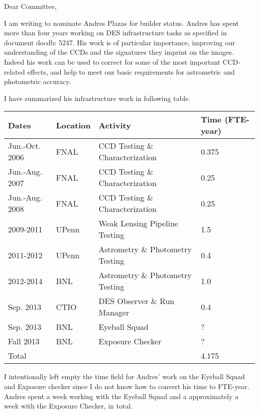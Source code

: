 \documentclass[12pt]{letter}
\begin{document}
\begin{letter}{}

\opening{Dear Committee,}

I am writing to nominate Andres Plazas for builder status.  Andres has spent
more than four years working on DES infrastructure tasks as specified in document
docdb: 5247. His work is of particular importance, improving our understanding
of the CCDs and the signatures they imprint on the images.  Indeed his work
can be used to correct for some of the most important CCD-related effects,
and help to meet our basic requirements for astrometric and photometric accuracy.

I have summarized his infrastructure work in following table.

\begin{tabular}{|l|l|l|l|}
    \hline
    Dates              & Location & Activity                         & Time (FTE-year) \\ \hline \hline
    Jun.-Oct. 2006     & FNAL     & CCD Testing \& Characterization  & 0.375 \\
    Jun.-Aug. 2007     & FNAL     & CCD Testing \& Characterization  & 0.25  \\
    Jun.-Aug. 2008     & FNAL     & CCD Testing \& Characterization  & 0.25  \\
    \hline
    2009-2011          & UPenn    & Weak Lensing Pipeline Testing    & 1.5 \\
    \hline
    2011-2012          & UPenn    & Astrometry \& Photometry Testing & 0.4 \\
    2012-2014          & BNL      & Astrometry \& Photometry Testing & 1.0 \\
    \hline
    Sep. 2013          & CTIO     & DES Observer \& Run Manager      & 0.4 \\
    \hline 
    Sep. 2013          & BNL      & Eyeball Squad                    & ? \\
    \hline 
    Fall 2013          & BNL      & Exposure Checker                 & ? \\
    \hline
    \hline
    Total              &          &                                  & 4.175 \\
    \hline
\end{tabular}

I intentionally left empty the time field for Andres' work on the Eyeball Squad
and Exposure checker since I do not know how to convert his time to FTE-year.
Andres spent a week working with the Eyeball Squad and a approximately a week
with the Exposure Checker, in total.


\end{letter}
\end{document}
